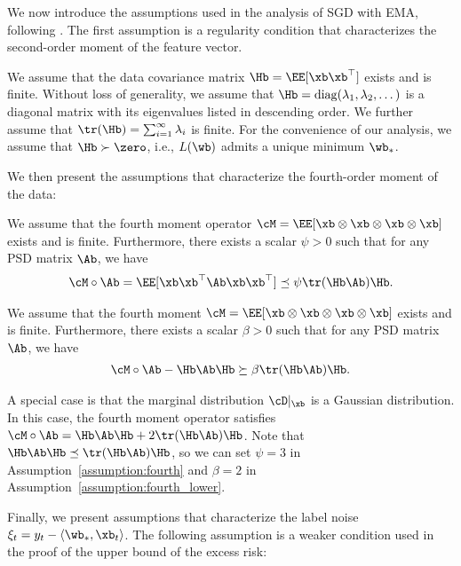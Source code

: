 \documentclass[11pt]{article}
\begin{document}
We now introduce the assumptions used in the analysis of SGD with EMA, following \citet{zou2021benign, wu2022last, li2023risk}. The first assumption is a regularity condition that characterizes the second-order moment of the feature vector.

\begin{assumption}\label{assumption:second}
We assume that the data covariance matrix $\Hb=\EE[\xb\xb^\top]$ exists and is finite. Without loss of generality, we assume that $\Hb=\mathrm{diag}(\lambda_1, \lambda_2, \dots)$ is a diagonal matrix with its eigenvalues listed in descending order.
We further assume that $\tr(\Hb)=\sum_{i=1}^\infty\lambda_i$ is finite. For the convenience of our analysis, we assume that $\Hb\succ\zero$, i.e., $L(\wb)$ admits a unique minimum $\wb_*$.
\end{assumption}

We then present the assumptions that characterize the fourth-order moment of the data:


\begin{assumption}\label{assumption:fourth}
We assume that the fourth moment operator $\cM=\EE[\xb\otimes\xb\otimes\xb\otimes\xb]$ exists and is finite. Furthermore, there exists a scalar $\psi>0$ such that for any PSD matrix $\Ab$, we have
\begin{align*}
\cM\circ\Ab=\EE[\xb\xb^\top\Ab\xb\xb^\top]\preceq\psi\tr(\Hb\Ab)\Hb.
\end{align*}
\end{assumption}
\begin{assumption}\label{assumption:fourth_lower}
We assume that the fourth moment $\cM=\EE[\xb\otimes\xb\otimes\xb\otimes\xb]$ exists and is finite. Furthermore, there exists a scalar $\beta>0$ such that for any PSD matrix $\Ab$, we have
\begin{align*}
\cM\circ\Ab-\Hb\Ab\Hb\succeq\beta\tr(\Hb\Ab)\Hb.
\end{align*}
\end{assumption}

A special case is that the marginal distribution $\cD|_{\xb}$ is a Gaussian distribution.
In this case, the fourth moment operator satisfies $\cM\circ\Ab=\Hb\Ab\Hb+2\tr(\Hb\Ab)\Hb$.
Note that $\Hb\Ab\Hb\preceq\tr(\Hb\Ab)\Hb$,
so we can set $\psi=3$ in Assumption~\ref{assumption:fourth} and $\beta=2$ in Assumption~\ref{assumption:fourth_lower}.

Finally, we present assumptions that characterize the label noise $\xi_t=y_t-\langle\wb_*, \xb_t\rangle$.
The following assumption is a weaker condition used in the proof of the upper bound of the excess risk:
\end{document}
